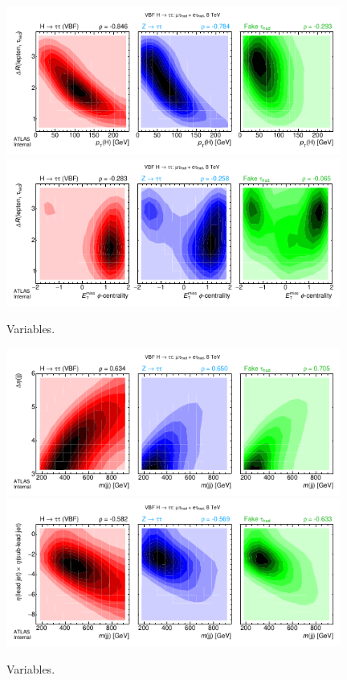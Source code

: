\begin{figure}[tp]
  \centering
  \includegraphics[width=0.98\textwidth]{figures/kinematiccorrelations/H_pt-vs-taulep_dR}
  \includegraphics[width=0.98\textwidth]{figures/kinematiccorrelations/met_phi_cent-vs-taulep_dR}
  \caption{Variables.}
  \label{fig:strategy-kinematic-correlations-2}
\end{figure}

\clearpage

\begin{figure}[tp]
  \centering
  \includegraphics[width=0.98\textwidth]{figures/kinematiccorrelations/jj_mass-vs-jj_deta}
  \includegraphics[width=0.98\textwidth]{figures/kinematiccorrelations/jj_mass-vs-jj_etaprod}
  \caption{Variables.}
  \label{fig:strategy-kinematic-correlations-3}
\end{figure}

